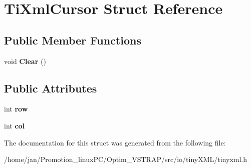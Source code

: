 \hypertarget{structTiXmlCursor}{}\section{Ti\+Xml\+Cursor Struct Reference}
\label{structTiXmlCursor}
\subsection*{Public Member Functions}
\begin{DoxyCompactItemize}
\item 
\mbox{\label{structTiXmlCursor_a1e6fa622b59dafb71b6efe595105dcdd}} 
void {\bfseries Clear} ()
\end{DoxyCompactItemize}
\subsection*{Public Attributes}
\begin{DoxyCompactItemize}
\item 
\mbox{\label{structTiXmlCursor_a5b54dd949820c2db061e2be41f3effb3}} 
int {\bfseries row}
\item 
\mbox{\label{structTiXmlCursor_a5694d7ed2c4d20109d350c14c417969d}} 
int {\bfseries col}
\end{DoxyCompactItemize}


The documentation for this struct was generated from the following file\+:\begin{DoxyCompactItemize}
\item 
/home/jan/\+Promotion\+\_\+linux\+P\+C/\+Optim\+\_\+\+V\+S\+T\+R\+A\+P/src/io/tiny\+X\+M\+L/tinyxml.\+h\end{DoxyCompactItemize}
